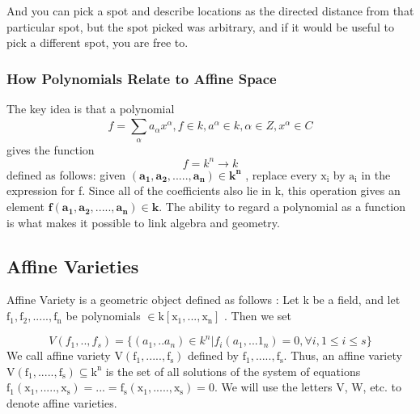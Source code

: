 \documentclass[11pt]{article}
\begin{document}
And you can pick a spot and describe locations as the directed distance from that particular spot, but the spot picked was arbitrary, and if it would be useful to pick a different spot, you are free to.

\subsubsection{How Polynomials Relate to Affine Space}
\cite{coxLittleOshea}The key idea is that a polynomial
\begin{equation}
   f =  \sum_{\alpha}^{}{a_{\alpha}{x}^{\alpha} }, f \in k, a^{\alpha} \in k, \alpha \in Z, {x}^{\alpha} \in C
\end{equation}
gives the function
\begin{equation}
   f =  k^n \rightarrow k
\end{equation}
defined as follows: given $\mathbf{(a_{1},a_2,.....,a_n) \in k^n}$ , replace every  $\mathrm{x_i}$ by $\mathrm{a_i}$ in the expression for f. Since all of the coefficients also lie in k, this operation gives an element $\mathbf{f(a_{1},a_2,.....,a_n) \in k}$.
The ability to regard a polynomial as a function is what makes it possible to link algebra and geometry.
\subsection{Affine Varieties}
\cite{coxLittleOshea} Affine Variety is a geometric object defined as follows :\newline
 Let k be a field, and let $\mathrm{f_1,f_2,.....,f_n}$ be polynomials $\mathrm{\in k[x_1,...,x_n]}$ . Then we set

\begin{equation}
   V(f_1,..,f_s)=\{(a_1,..a_n) \in k^n | f_i(a_1,...1_n)=0 , \forall i, 1 \le i \le s  \}
\end{equation}
We call affine variety $\mathrm{V(f_1,.....,f_s)}$ defined by  $\mathrm{f_1,.....,f_s}$. \newline
 Thus, an affine variety $\mathrm{V(f_1,.....,f_s) \subseteq k^n}$ is the set of all solutions of the system of equations  $\mathrm{f_1(x_1,.....,x_s)=...=f_s(x_1,.....,x_s)=0}$. We will use the letters V, W, etc. to denote affine varieties.
\end{document}
